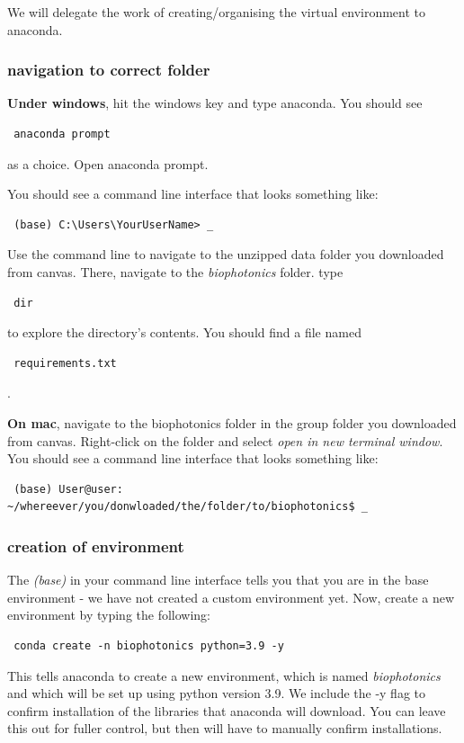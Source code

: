 \documentclass[11pt]{article} %
\begin{document}
We will delegate the work of creating/organising the virtual environment to anaconda. 

\subsubsection{navigation to correct folder}
{\bf Under windows}, hit the windows key and type anaconda. You should see 
\begin{verbatim} anaconda prompt \end{verbatim} 
as a choice. Open anaconda prompt. 

You should see a command line interface that looks something like:

\begin{verbatim} (base) C:\Users\YourUserName> _ \end{verbatim}


Use the command line to navigate to the unzipped data folder you downloaded from canvas. 
There, navigate to the {\it biophotonics} folder. 
type \begin{verbatim} dir \end{verbatim}
to explore the directory's contents.
You should find a file named \begin{verbatim} requirements.txt \end{verbatim}.

{\bf On mac}, navigate to the biophotonics folder in the group folder you downloaded from canvas. Right-click on the folder and select {\it open in new terminal window}.
You should see a command line interface that looks something like:

\begin{verbatim} (base) User@user: ~/whereever/you/donwloaded/the/folder/to/biophotonics$ _ \end{verbatim}

\subsubsection{creation of environment}
The {\it (base)} in your command line interface tells you that you are in the base environment - we have not created a custom environment yet. 
Now, create a new environment by typing the following:
\begin{verbatim} conda create -n biophotonics python=3.9 -y \end{verbatim}
This tells anaconda to create a new environment, which is named {\it biophotonics} and which will be set up using python version 3.9.
We include the -y flag to confirm installation of the libraries that anaconda will download. You can leave this out for fuller control, but then will have to manually confirm installations.
\end{document}
